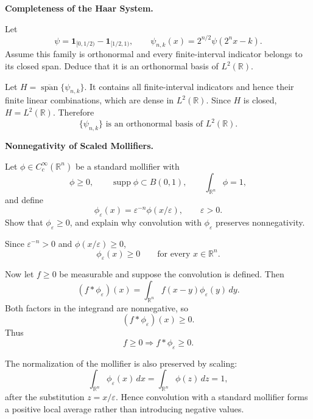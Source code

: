 \begin{problem}[CP-II-0208]
\label{prob:cp-ii-0208}
\textbf{Completeness of the Haar System.}

\hspace*{1.5em}Let
\[
\psi=\mathbf1_{[0,1/2)}-\mathbf1_{[1/2,1)},\qquad \psi_{n,k}(x)=2^{n/2}\psi(2^nx-k).
\]
Assume this family is orthonormal and every finite-interval indicator belongs to its closed span. Deduce that it is an orthonormal basis of \(L^2(\mathbb R)\).
\end{problem}

\begin{solution}
Let \(H=\overline{\operatorname{span}}\{\psi_{n,k}\}\). It contains all finite-interval indicators and hence their finite linear combinations, which are dense in \(L^2(\mathbb R)\). Since \(H\) is closed, \(H=L^2(\mathbb R)\). Therefore
\[
\boxed{\{\psi_{n,k}\}\text{ is an orthonormal basis of }L^2(\mathbb R).}
\]
\end{solution}


\begin{problem}[CP-II-0209]
\label{prob:cp-ii-0209}
\textbf{Nonnegativity of Scaled Mollifiers.}

\hspace*{1.5em}Let \(\phi\in C_c^\infty(\mathbb R^n)\) be a standard mollifier with
\[
\phi\ge0,
\qquad
\operatorname{supp}\phi\subset B(0,1),
\qquad
\int_{\mathbb R^n}\phi=1,
\]
and define
\[
\phi_\varepsilon(x)=\varepsilon^{-n}\phi(x/\varepsilon),
\qquad \varepsilon>0.
\]
Show that \(\phi_\varepsilon\ge0\), and explain why convolution with
\(\phi_\varepsilon\) preserves nonnegativity.
\end{problem}

\begin{solution}
Since \(\varepsilon^{-n}>0\) and \(\phi(x/\varepsilon)\ge0\),
\[
\boxed{\phi_\varepsilon(x)\ge0\qquad\text{for every }x\in\mathbb R^n.}
\]

Now let \(f\ge0\) be measurable and suppose the convolution is defined. Then
\[
(f*\phi_\varepsilon)(x)
=
\int_{\mathbb R^n}
f(x-y)\phi_\varepsilon(y)\,dy.
\]
Both factors in the integrand are nonnegative, so
\[
(f*\phi_\varepsilon)(x)\ge0.
\]
Thus
\[
\boxed{f\ge0\Longrightarrow f*\phi_\varepsilon\ge0.}
\]

The normalization of the mollifier is also preserved by scaling:
\[
\int_{\mathbb R^n}\phi_\varepsilon(x)\,dx
=
\int_{\mathbb R^n}\phi(z)\,dz
=
1,
\]
after the substitution \(z=x/\varepsilon\). Hence convolution with a standard
mollifier forms a positive local average rather than introducing negative values.
\end{solution}


